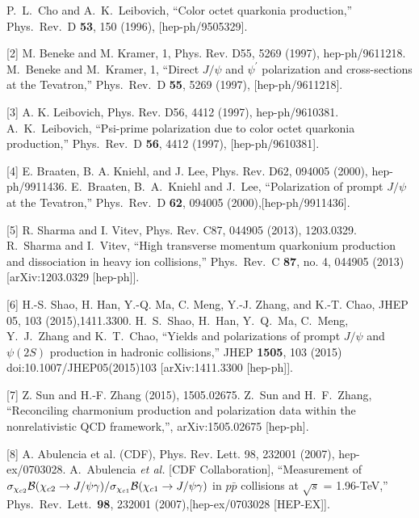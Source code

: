 \documentclass[aps,prc,preprint]{revtex4}
\begin{document}
\noindent
\begin{thebibliography}{100}
\medskip


  P.~L.~Cho and A.~K.~Leibovich,
  ``Color octet quarkonia production,''
  Phys.\ Rev.\ D {\bf 53}, 150 (1996),
  [hep-ph/9505329].

  

[2] M. Beneke and M. Kramer, 1, Phys. Rev. D55, 5269 (1997), hep-ph/9611218.
  M.~Beneke and M.~Kramer, 1,
  ``Direct $J/\psi$ and $\psi^\prime$ polarization and cross-sections at the Tevatron,''
  Phys.\ Rev.\ D {\bf 55}, 5269 (1997), [hep-ph/9611218].

[3] A. K. Leibovich, Phys. Rev. D56, 4412 (1997), hep-ph/9610381.
  A.~K.~Leibovich,
  ``Psi-prime polarization due to color octet quarkonia production,''
  Phys.\ Rev.\ D {\bf 56}, 4412 (1997), [hep-ph/9610381].

[4] E. Braaten, B. A. Kniehl, and J. Lee, Phys. Rev. D62, 094005 (2000), hep-ph/9911436.
  E.~Braaten, B.~A.~Kniehl and J.~Lee,
  ``Polarization of prompt $J/\psi$ at the Tevatron,''
  Phys.\ Rev.\ D {\bf 62}, 094005 (2000),[hep-ph/9911436].

[5] R. Sharma and I. Vitev, Phys. Rev. C87, 044905 (2013), 1203.0329.
  R.~Sharma and I.~Vitev,
  ``High transverse momentum quarkonium production and dissociation in heavy ion collisions,''
  Phys.\ Rev.\ C {\bf 87}, no. 4, 044905 (2013)
  [arXiv:1203.0329 [hep-ph]].



[6] H.-S. Shao, H. Han, Y.-Q. Ma, C. Meng, Y.-J. Zhang, and K.-T. Chao, JHEP 05, 103 (2015),1411.3300.
  H.~S.~Shao, H.~Han, Y.~Q.~Ma, C.~Meng, Y.~J.~Zhang and K.~T.~Chao,
  ``Yields and polarizations of prompt $J/\psi$ and $\psi(2S)$ production in hadronic collisions,''
  JHEP {\bf 1505}, 103 (2015)
  doi:10.1007/JHEP05(2015)103
  [arXiv:1411.3300 [hep-ph]].


[7] Z. Sun and H.-F. Zhang (2015), 1505.02675.
  Z.~Sun and H.~F.~Zhang,
  ``Reconciling charmonium production and polarization data within the nonrelativistic QCD framework,'',
  arXiv:1505.02675 [hep-ph].

[8] A. Abulencia et al. (CDF), Phys. Rev. Lett. 98, 232001 (2007), hep-ex/0703028.
  A.~Abulencia {\it et al.} [CDF Collaboration],
  ``Measurement of $\sigma_{\chi_{c2}}{\cal B}(\chi_{c2} \to J/\psi \gamma)/\sigma_{\chi_{c1}} {\cal B}(\chi_{c1} \to J/\psi \gamma)$ 
  in $p \bar{p}$ collisions at $\sqrt{s}$ = 1.96-TeV,''
  Phys.\ Rev.\ Lett.\  {\bf 98}, 232001 (2007),[hep-ex/0703028 [HEP-EX]].


\end{thebibliography}
\end{document}
